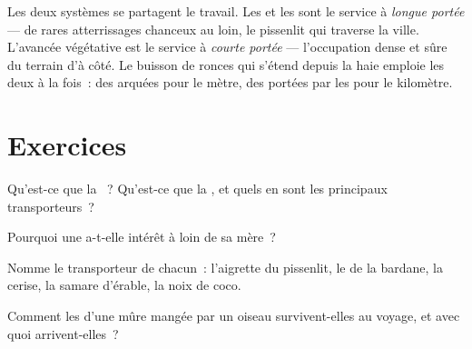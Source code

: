 \begin{remark}\label{rem:g6:how-plants-spread:twospeeds}
Les deux systèmes se partagent le travail. Les  et les 
sont le service à \emph{longue portée} --- de rares atterrissages
chanceux au loin, le pissenlit qui traverse la ville. L'avancée
végétative est le service à \emph{courte portée} --- l'occupation
dense et sûre du terrain d'à côté. Le buisson de ronces qui s'étend
depuis la haie emploie les deux à la fois~: des  arquées pour
le mètre, des  portées par les  pour le kilomètre.
\end{remark}

\section{Exercices}

\begin{exercise}[$\star$]\label{exo:g6:how-plants-spread:1}
Qu'est-ce que la ~? Qu'est-ce que la , et
quels en sont les principaux transporteurs~?
\end{exercise}

\begin{exercise}[$\star$]\label{exo:g6:how-plants-spread:2}
Pourquoi une  a-t-elle intérêt à  loin de sa mère~?
\end{exercise}

\begin{exercise}[$\star$]\label{exo:g6:how-plants-spread:3}
Nomme le transporteur de chacun~: l'aigrette du pissenlit, le 
de la bardane, la cerise, la samare d'érable, la noix de coco.
\end{exercise}

\begin{exercise}[$\star$]\label{exo:g6:how-plants-spread:4}
Comment les  d'une mûre mangée par un oiseau survivent-elles
au voyage, et avec quoi arrivent-elles~?
\end{exercise}

